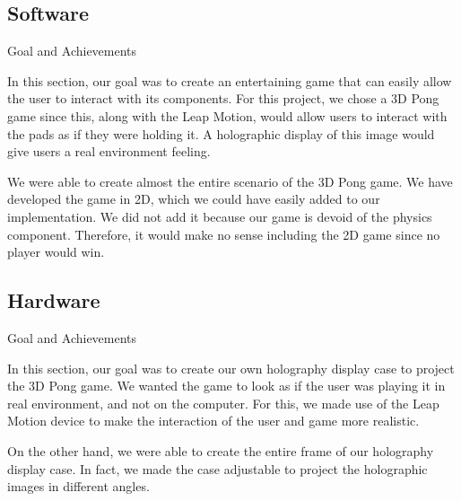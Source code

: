 \documentclass{sig-alternate}
\begin{document}
	\subsection{Software}
	
		Goal and Achievements\newline
	
		In this section, our goal was to create an entertaining game that can easily allow the user to interact with its components. For this project, we chose a 3D Pong game since this, along with the Leap Motion, would allow users to interact with the pads as if they were holding it. A holographic display of this image would give users a real environment feeling.\newline

		We were able to create almost the entire scenario of the 3D Pong game. We have developed the game in 2D, which we could have easily added to our implementation. We did not add it because our game is devoid of the physics component. Therefore, it would make no sense including the 2D game since no player would win.\newline
		
	\subsection{Hardware}
	
		Goal and Achievements\newline
		
		In this section, our goal was to create our own holography display case to project the 3D Pong game. We wanted the game to look as if the user was playing it in real environment, and not on the computer. For this, we made use of the Leap Motion device to make the interaction of the user and game more realistic.  \newline
		
		On the other hand, we were able to create the entire frame of our holography display case. In fact, we made the case adjustable to project the holographic images in different angles. \newline
	
\end{document}
